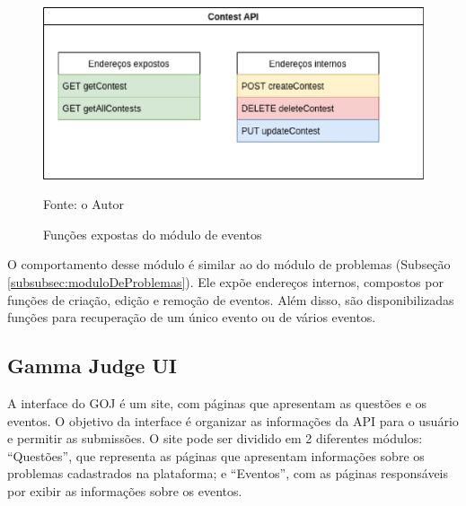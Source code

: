 \begin{figure}
    \centering
    \caption{Funções expostas do módulo de eventos}
    \includegraphics[keepaspectratio=true,scale=0.5]{figuras/contests_endpoint.eps}
    \label{fig:contests_endpoint}
    
    \medskip
    Fonte: o Autor
    \medskip
\end{figure}

O comportamento desse módulo é similar ao do módulo de problemas (Subseção \ref{subsubsec:moduloDeProblemas}). Ele expõe endereços internos, compostos por funções de criação, edição e remoção de eventos. Além disso, são disponibilizadas funções para recuperação de um único evento ou de vários eventos.

\subsection{Gamma Judge UI}
\label{sec:gamaJudgeUI}

A interface do GOJ é um site, com páginas que apresentam as questões e os eventos. O objetivo da interface é organizar as informações da API para o usuário e permitir as submissões. O site pode ser dividido em 2 diferentes módulos: ``Questões'', que representa as páginas que apresentam informações sobre os problemas cadastrados na plataforma; e ``Eventos'', com as páginas responsáveis por exibir as informações sobre os eventos. 



